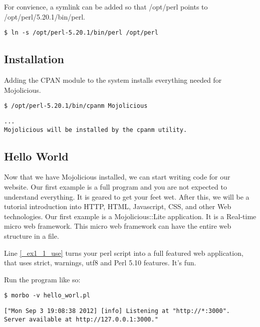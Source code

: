 \documentclass[17pt]{extreport}
\newcommand\Small{\fontsize{10}{10.2}\selectfont}
\newcommand*\LSTfont{\Small\ttfamily\SetTracking{encoding=*}{-60}\lsstyle}
\begin{document}
For convience, a symlink can be added so that /opt/perl points to
/opt/perl/5.20.1/bin/perl.

\begin{lstlisting}[style=BashInputStyle]
$ ln -s /opt/perl-5.20.1/bin/perl /opt/perl
\end{lstlisting}

\subsection{Installation}

Adding the CPAN module to the system installs everything needed for
Mojolicious. 

\begin{lstlisting}[style=BashInputStyle]
$ /opt/perl-5.20.1/bin/cpanm Mojolicious
\end{lstlisting}

\begin{lstlisting}[style=BashOutputStyle]
...
Mojolicious will be installed by the cpanm utility.
\end{lstlisting}

\subsection{Hello World}

Now that we have Mojolicious installed, we can start writing code for our
website. Our first example is a full program and you are not expected to
understand everything. It is geared to get your feet wet. After this, we will
be a tutorial introduction into HTTP, HTML, Javascript, CSS, and other Web
technologies.  Our first example is a Mojolicious::Lite application. It is a
Real-time micro web framework. This micro web framework can have the entire web
structure in a file.



Line \ref{_ex1_1_use} turns your perl script into a full featured web
application, that uses strict, warnings, utf8 and Perl 5.10 features. It's fun.

Run the program like so:

\begin{lstlisting}[style=BashInputStyle]
$ morbo -v hello_worl.pl
\end{lstlisting}

\begin{lstlisting}[style=BashOutputStyle]
["Mon Sep 3 19:08:38 2012] [info] Listening at "http://*:3000".
Server available at http://127.0.0.1:3000."
\end{lstlisting}
\end{document}
